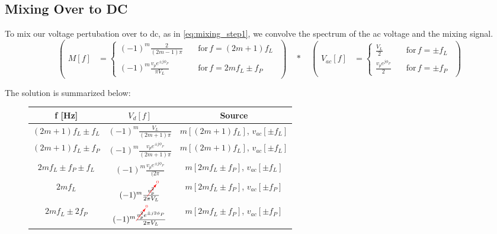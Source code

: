 \documentclass{article}
\newcommand{\cancelToZero}[1]{\textcolor{red}{\cancelto{0}{\textcolor{black}{#1}}}}
\begin{document}
\subsection{Mixing Over to DC}

To mix our voltage pertubation over to dc, as in \eqref{eq:mixing_step1}, we convolve the spectrum of the ac voltage and the mixing signal.
\begin{equation}
	\left(\begin{split}
  		M[f] &= \begin{cases}
			(-1)^m \frac{2}{(2m-1)\pi} \quad & \mathrm{for} \, f=(2m+1)f_L \\
			(-1)^m \frac{v_pe^{\pm j \phi_P}}{\pi V_L} \quad & \mathrm{for} \, f= 2mf_L\pm f_P
    	\end{cases}
  	\end{split}\right)
\quad\ast\quad
	\left(\begin{split}
    	V_{ac}[f] &= \begin{cases}
			\frac{V_L}{2} \quad & \mathrm{for} \, f=\pm f_L \\
			\frac{v_p e^{j\phi_P}}{2} \quad & \mathrm{for} \, f=\pm f_P
    	\end{cases}
  	\end{split}\right) \nonumber
\end{equation}

The solution is summarized below\cite{sun_2007}:
\begin{figure}[ht]
	\centering
	\def\arraystretch{2}
	\begin{tabular}{c c c}
	\hline
	f [\si{\hertz}] 		& $V_d[f]$											& Source \\
	\hline
	$(2m+1)f_L\pm f_L$ 		& $(-1)^m \frac{V_L}{(2m+1)\pi}$					& $m[(2m+1)f_L]$, $v_{ac}[\pm f_L]$ \\
	$(2m+1)f_L\pm f_P$ 		& $(-1)^m \frac{v_pe^{\pm j \phi_P}}{(2m+1)\pi}$			& $m[(2m+1)f_L]$, $v_{ac}[\pm f_L]$ \\
	$2mf_L\pm f_P \pm f_L$ 	& $(-1)^m \frac{v_pe^{\pm j \phi_P}}{(2\pi}$	& $m[2mf_L\pm f_P]$, $v_{ac}[\pm f_L]$ \\
	$2mf_L$			 		& $(-1)^m \frac{\cancelToZero{v_p^2}}{2\pi V_L}$					& $m[2mf_L\pm f_P]$, $v_{ac}[\pm f_P]$ \\
	$2mf_L\pm 2f_P$ 		& $(-1)^m \frac{\cancelToZero{v_p^2}e^{\pm j2\phi_P}}{2\pi V_L}$	& $m[2mf_L\pm f_P]$, $v_{ac}[\pm f_P]$ \\
	\end{tabular}
\end{figure}
\end{document}
